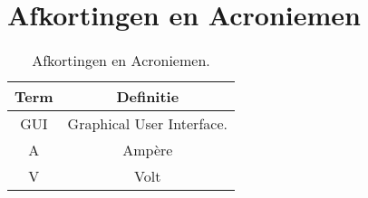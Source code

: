 \section{Afkortingen en Acroniemen}

\begin{table}[h!]
	\centering
	\begin{tabular}{ |c||c|  }
		\hline
		\textbf{Term} & \textbf{Definitie} \\ [0.4ex]
		\hline
		GUI   & Graphical User Interface. \\
		A & Ampère \\
		V & Volt \\ [0.4ex]
		\hline
	\end{tabular}
	\caption{Afkortingen en Acroniemen.}
	\label{table:Afkortingen}
\end{table}
